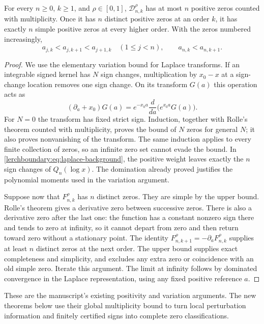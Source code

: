 \begin{proposition}
\label{lerchboundary:prop:bound-background}
For every $n\geq0$, $k\geq1$, and $\rho\in[0,1]$,
$\mathcal D_{n,k}^{\rho}$ has at most $n$ positive zeros counted
with multiplicity. Once it has $n$ distinct positive zeros at an
order $k$, it has exactly $n$ simple positive zeros at every higher
order. With the zeros numbered increasingly,
\[
 a_{j,k}<a_{j,k+1}<a_{j+1,k}\quad(1\leq j<n),
 \qquad a_{n,k}<a_{n,k+1}.
\]
\end{proposition}

\begin{proof}
We use the elementary variation bound for Laplace transforms.
If an integrable signed kernel has $N$ sign changes, multiplication
by $x_0-x$ at a sign-change location removes one sign change.
On its transform $G(a)$ this operation acts as
\[
 (\partial_a+x_0)G(a)
 =e^{-x_0a}\frac{d}{da}\bigl(e^{x_0a}G(a)\bigr).
\]
For $N=0$ the transform has fixed strict sign. Induction, together
with Rolle's theorem counted with multiplicity, proves the bound
of $N$ zeros for general $N$; it also proves nonvanishing of the
transform. The same induction applies to every finite collection
of zeros, so an infinite zero set cannot evade the bound.
In \eqref{lerchboundary:eq:laplace-background}, the positive
weight leaves exactly the $n$ sign changes of $Q_n(\log x)$.
The domination already proved justifies the polynomial moments
used in the variation argument.

Suppose now that $F_{n,k}^{\rho}$ has $n$ distinct zeros. They are
simple by the upper bound. Rolle's theorem gives a derivative zero
between successive zeros. There is also a derivative zero after
the last one: the function has a constant nonzero sign there and
tends to zero at infinity, so it cannot depart from zero and then
return toward zero without a stationary point. The identity
$F_{n,k+1}^{\rho}=-\partial_aF_{n,k}^{\rho}$ supplies at least $n$
distinct zeros at the next order. The upper bound supplies exact
completeness and simplicity, and excludes any extra zero or
coincidence with an old simple zero. Iterate this argument.
The limit at infinity follows by dominated convergence in the
Laplace representation, using any fixed positive reference $a$.
\end{proof}

These are the manuscript's existing positivity and variation arguments.
The new theorems below use their global multiplicity bound to turn
local perturbation information and finitely certified signs into
complete zero classifications.
